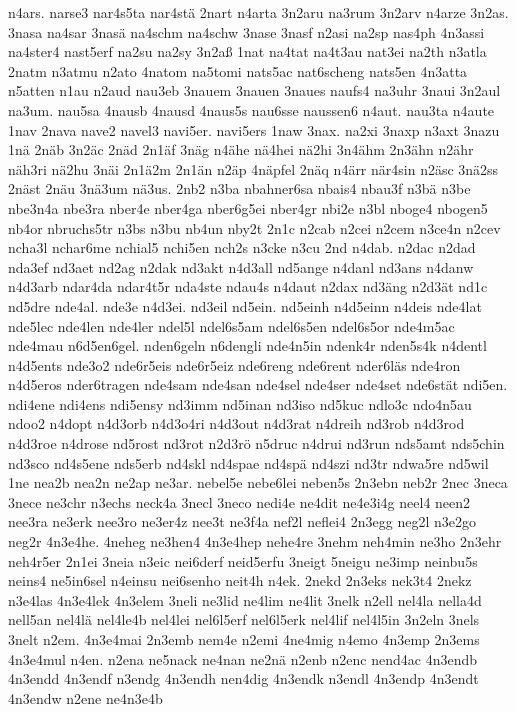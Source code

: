 {n4ars.
narse3
nar4s5ta
nar4stä
2nart
n4arta
3n2aru
na3rum
3n2arv
n4arze
3n2as.
3nasa
na4sar
3nasä
na4schm
na4schw
3nase
3nasf
n2asi
na2sp
nas4ph
4n3assi
na4ster4
nast5erf
na2su
na2sy
3n2aß
1nat
na4tat
na4t3au
nat3ei
na2th
n3atla
2natm
n3atmu
n2ato
4natom
na5tomi
nats5ac
nat6scheng
nats5en
4n3atta
n5atten
n1au
n2aud
nau3eb
3nauem
3nauen
3naues
naufs4
na3uhr
3naui
3n2aul
na3um.
nau5sa
4nausb
4nausd
4naus5s
nau6sse
naussen6
n4aut.
nau3ta
n4aute
1nav
2nava
nave2
navel3
navi5er.
navi5ers
1naw
3nax.
na2xi
3naxp
n3axt
3nazu
1nä
2näb
3n2äc
2näd
2n1äf
3näg
n4ähe
nä4hei
nä2hi
3n4ähm
2n3ähn
n2ähr
näh3ri
nä2hu
3näi
2n1ä2m
2n1än
n2äp
4näpfel
2näq
n4ärr
när4sin
n2äsc
3nä2ss
2näst
2näu
3nä3um
nä3us.
2nb2
n3ba
nbahner6sa
nbais4
nbau3f
n3bä
n3be
nbe3n4a
nbe3ra
nber4e
nber4ga
nber6g5ei
nber4gr
nbi2e
n3bl
nboge4
nbogen5
nb4or
nbruchs5tr
n3bs
n3bu
nb4un
nby2t
2n1c
n2cab
n2cei
n2cem
n3ce4n
n2cev
ncha3l
nchar6me
nchial5
nchi5en
nch2s
n3cke
n3cu
2nd
n4dab.
n2dac
n2dad
nda3ef
nd3aet
nd2ag
n2dak
nd3akt
n4d3all
nd5ange
n4danl
nd3ans
n4danw
n4d3arb
ndar4da
ndar4t5r
nda4ste
ndau4s
n4daut
n2dax
nd3äng
n2d3ät
nd1c
nd5dre
nde4al.
nde3e
n4d3ei.
nd3eil
nd5ein.
nd5einh
n4d5einn
n4deis
nde4lat
nde5lec
nde4len
nde4ler
ndel5l
ndel6s5am
ndel6s5en
ndel6s5or
nde4m5ac
nde4mau
n6d5en6gel.
nden6geln
n6dengli
nde4n5in
ndenk4r
nden5s4k
n4dentl
n4d5ents
nde3o2
nde6r5eis
nde6r5eiz
nde6reng
nde6rent
nder6läs
nde4ron
n4d5eros
nder6tragen
nde4sam
nde4san
nde4sel
nde4ser
nde4set
nde6stät
ndi5en.
ndi4ene
ndi4ens
ndi5ensy
nd3imm
nd5inan
nd3iso
nd5kuc
ndlo3c
ndo4n5au
ndoo2
n4dopt
n4d3orb
n4d3o4ri
n4d3out
n4d3rat
n4dreih
nd3rob
n4d3rod
n4d3roe
n4drose
nd5rost
nd3rot
n2d3rö
n5druc
n4drui
nd3run
nds5amt
nds5chin
nd3sco
nd4s5ene
nds5erb
nd4skl
nd4spae
nd4spä
nd4szi
nd3tr
ndwa5re
nd5wil
1ne
nea2b
nea2n
ne2ap
ne3ar.
nebel5e
nebe6lei
neben5s
2n3ebn
neb2r
2nec
3neca
3nece
ne3chr
n3echs
neck4a
3necl
3neco
nedi4e
ne4dit
ne4e3i4g
neel4
neen2
nee3ra
ne3erk
nee3ro
ne3er4z
nee3t
ne3f4a
nef2l
neflei4
2n3egg
neg2l
n3e2go
neg2r
4n3e4he.
4neheg
ne3hen4
4n3e4hep
nehe4re
3nehm
neh4min
ne3ho
2n3ehr
neh4r5er
2n1ei
3neia
n3eic
nei6derf
neid5erfu
3neigt
5neigu
ne3imp
neinbu5s
neins4
ne5in6sel
n4einsu
nei6senho
neit4h
n4ek.
2nekd
2n3eks
nek3t4
2nekz
n3e4las
4n3e4lek
4n3elem
3neli
ne3lid
ne4lim
ne4lit
3nelk
n2ell
nel4la
nella4d
nell5an
nel4lä
nel4le4b
nel4lei
nel6l5erf
nel6l5erk
nel4lif
nel4l5in
3n2eln
3nels
3nelt
n2em.
4n3e4mai
2n3emb
nem4e
n2emi
4ne4mig
n4emo
4n3emp
2n3ems
4n3e4mul
n4en.
n2ena
ne5nack
ne4nan
ne2nä
n2enb
n2enc
nend4ac
4n3endb
4n3endd
4n3endf
n3endg
4n3endh
nen4dig
4n3endk
n3endl
4n3endp
4n3endt
4n3endw
n2ene
ne4n3e4b
}
